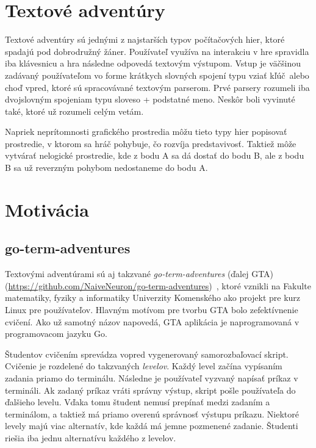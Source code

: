 \section{Textové adventúry}
\label{sec:textadventures}

Textové adventúry sú jednými z najstarších typov počítačových hier, ktoré spadajú
pod dobrodružný žáner. Používateľ využíva na interakciu v hre spravidla iba klávesnicu
a hra následne odpovedá textovým výstupom.
Vstup je väčšinou zadávaný používateľom vo forme krátkych slovných spojení
typu \glqq vziať kľúč\grqq~alebo \glqq choď vpred\grqq, ktoré sú spracovávané
textovým parserom. Prvé parsery rozumeli iba dvojslovným spojeniam typu sloveso + podstatné meno. Neskôr boli vyvinuté také, ktoré už rozumeli celým vetám.

Napriek neprítomnosti grafického prostredia môžu tieto typy hier popisovať prostredie, v ktorom sa hráč pohybuje, čo rozvíja predstavivosť. Taktiež môže vytvárať nelogické
prostredie, kde z bodu A sa dá dostať do bodu B, ale z bodu B sa už reverzným pohybom
nedostaneme do bodu A.~\cite{bib:adventures}


\section{Motivácia}
\label{sec:motivacia}

\subsection{go-term-adventures}
\label{sec:motivacia:gta}

Textovými adventúrami sú aj takzvané \textit{go-term-adventures} (ďalej GTA) (\url{https://github.com/NaiveNeuron/go-term-adventures})~\cite{bib:gta}, ktoré vznikli
na Fakulte matematiky, fyziky a informatiky Univerzity Komenského ako projekt pre kurz Linux pre používateľov. Hlavným motívom pre tvorbu GTA bolo zefektívnenie cvičení.
Ako už samotný názov napovedá, GTA aplikácia je naprogramovaná v programovacom
jazyku Go.

Študentov cvičením sprevádza vopred vygenerovaný samorozbaľovací skript. Cvičenie
je rozdelené do takzvaných \textit{levelov}. Každý level začína vypísaním zadania priamo do
terminálu. Následne je používateľ vyzvaný napísať príkaz v termináli. Ak zadaný príkaz
vráti správny výstup, skript pošle používateľa do ďalšieho levelu. Vďaka tomu
študent nemusí prepínať medzi zadaním a terminálom, a taktiež má priamo overenú
správnosť výstupu príkazu. Niektoré levely majú viac alternatív, kde každá
má jemne pozmenené zadanie. Študenti riešia iba jednu alternatívu každého z levelov.

